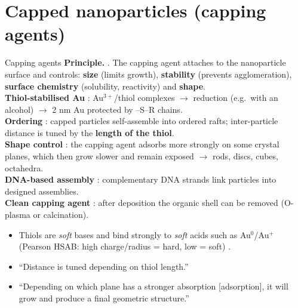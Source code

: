 \section{Capped nanoparticles (capping agents)}
\begin{cardbox}{Capping agents }
\textbf{Principle.} . The capping agent attaches to the
nanoparticle surface and controls:
\textbf{size} (limits growth), \textbf{stability} (prevents agglomeration), \textbf{surface chemistry} (solubility,
reactivity) and \textbf{shape}.\\
\textbf{Thiol-stabilised Au} : Au$^{3+}$/thiol complexes $\to$ reduction (e.g.\ with an alcohol) $\to$
2 nm Au protected by --S--R chains.\\
\textbf{Ordering} : capped particles self-assemble into ordered rafts; inter-particle distance is tuned by the
\textbf{length of the thiol}.\\
\textbf{Shape control} : the capping agent adsorbs more strongly on some crystal planes, which then grow slower
and remain exposed $\to$ rods, discs, cubes, octahedra.\\
\textbf{DNA-based assembly} : complementary DNA strands link particles into designed assemblies.\\
\textbf{Clean capping agent} : after deposition the organic shell can be removed (O-plasma or calcination).
\end{cardbox}
\begin{classbox}
\begin{itemize}
  \item Thiols are \emph{soft} bases and bind strongly to \emph{soft} acids such as Au$^0$/Au$^+$ (Pearson HSAB:
        high charge/radius = hard, low = soft) .
  \item ``Distance is tuned depending on thiol length.'' 
  \item ``Depending on which plane has a stronger absorption [adsorption], it will grow and produce a final geometric
        structure.'' 
\end{itemize}
\end{classbox}


